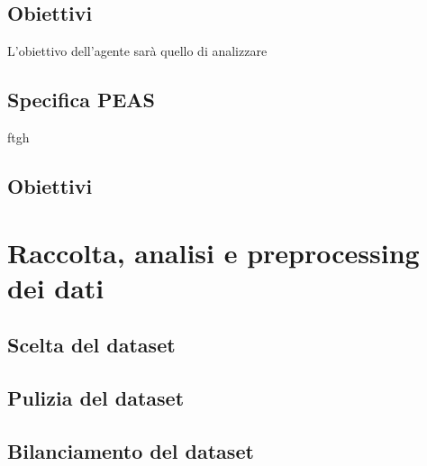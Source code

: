 \documentclass{article} %
\begin{document}
    \subsection{Obiettivi}
    L'obiettivo dell'agente sarà quello di analizzare
    \subsection{Specifica PEAS}
    ftgh
    \subsection{Obiettivi}
    \section{Raccolta, analisi e preprocessing dei dati}
    \subsection{Scelta del dataset}
    \subsection{Pulizia del dataset}
    \subsection{Bilanciamento del dataset}
\end{document}
